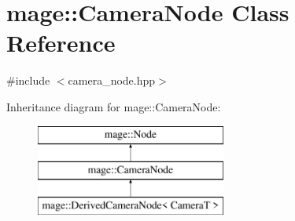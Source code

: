 \hypertarget{classmage_1_1_camera_node}{}\section{mage\+:\+:Camera\+Node Class Reference}
\label{classmage_1_1_camera_node}


{\ttfamily \#include $<$camera\+\_\+node.\+hpp$>$}

Inheritance diagram for mage\+:\+:Camera\+Node\+:\begin{figure}[H]
\begin{center}
\leavevmode
\includegraphics[height=3.000000cm]{classmage_1_1_camera_node}
\end{center}
\end{figure}
